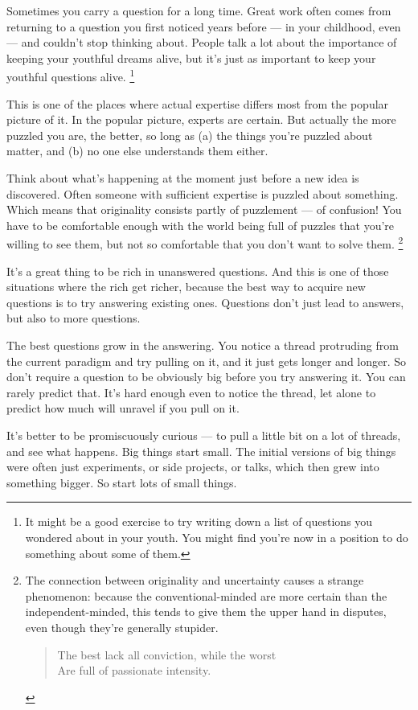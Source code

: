 \documentclass[12pt]{book}
\begin{document}
Sometimes you carry a question for a long time. Great work often comes
from returning to a question you first noticed years before --- in your
childhood, even --- and couldn't stop thinking about. People talk a lot
about the importance of keeping your youthful dreams alive, but it's
just as important to keep your youthful questions alive.
\footnote{It might be a good exercise to try writing down a list of
questions you wondered about in your youth. You might find you're now in
a position to do something about some of them.}

This is one of the places where actual expertise differs most from the
popular picture of it. In the popular picture, experts are certain. But
actually the more puzzled you are, the better, so long as (a) the things
you're puzzled about matter, and (b) no one else understands them
either.

Think about what's happening at the moment just before a new idea is
discovered. Often someone with sufficient expertise is puzzled about
something. Which means that originality consists partly of puzzlement
--- of confusion! You have to be comfortable enough with the world being
full of puzzles that you're willing to see them, but not so comfortable
that you don't want to solve them. \footnote{The connection between originality and uncertainty causes a
strange phenomenon: because the conventional-minded are more certain
than the independent-minded, this tends to give them the upper hand in
disputes, even though they're generally stupider.

\begin{quote}
The best lack all conviction, while the worst\\
Are full of passionate intensity.
\end{quote}}

It's a great thing to be rich in unanswered questions. And this is one
of those situations where the rich get richer, because the best way to
acquire new questions is to try answering existing ones. Questions don't
just lead to answers, but also to more questions.

The best questions grow in the answering. You notice a thread protruding
from the current paradigm and try pulling on it, and it just gets longer
and longer. So don't require a question to be obviously big before you
try answering it. You can rarely predict that. It's hard enough even to
notice the thread, let alone to predict how much will unravel if you
pull on it.

It's better to be promiscuously curious --- to pull a little bit on a
lot of threads, and see what happens. Big things start small. The
initial versions of big things were often just experiments, or side
projects, or talks, which then grew into something bigger. So start lots
of small things.
\end{document}
